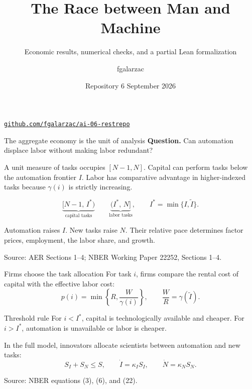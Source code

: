 \documentclass[aspectratio=169,11pt]{beamer}
\title{The Race between Man and Machine}
\subtitle{Economic results, numerical checks, and a partial Lean formalization}
\author{fgalarzac}
\date{Repository 6 \textperiodcentered{} September 2026}
\newcommand{\source}[1]{\vfill{\tiny\color{navy!70}Source: #1}}
\begin{document}
\begin{frame}[plain]
  \titlepage
  \begin{center}
    \small\href{https://github.com/fgalarzac/ai-06-restrepo}{\texttt{github.com/fgalarzac/ai-06-restrepo}}
  \end{center}
\end{frame}

\begin{frame}{The aggregate economy is the unit of analysis}
  \textbf{Question.} Can automation displace labor without making labor redundant?

  \medskip
  A unit measure of tasks occupies $[N-1,N]$. Capital can perform tasks below
  the automation frontier $I$. Labor has comparative advantage in higher-indexed
  tasks because $\gamma(i)$ is strictly increasing.

  \[
    \underbrace{[N-1,\,I^*)}_{\text{capital tasks}}
    \qquad
    \underbrace{(I^*,\,N]}_{\text{labor tasks}},
    \qquad
    I^*=\min\{I,\widetilde I\}.
  \]

  Automation raises $I$. New tasks raise $N$. Their relative pace determines
  factor prices, employment, the labor share, and growth.

  \source{AER Sections 1--4; NBER Working Paper 22252, Sections 1--4.}
\end{frame}

\begin{frame}{Firms choose the task allocation}
  For task $i$, firms compare the rental cost of capital with the effective
  labor cost:
  \[
    p(i)=\min\left\{R,\frac{W}{\gamma(i)}\right\},
    \qquad
    \frac{W}{R}=\gamma(\widetilde I).
  \]

  \begin{block}{Threshold rule}
    For $i<I^*$, capital is technologically available and cheaper. For
    $i>I^*$, automation is unavailable or labor is cheaper.
  \end{block}

  In the full model, innovators allocate scientists between automation and
  new tasks:
  \[
    S_I+S_N\leq S,\qquad
    \dot I=\kappa_I S_I,\qquad
    \dot N=\kappa_N S_N.
  \]

  \source{NBER equations (3), (6), and (22).}
\end{frame}
\end{document}
